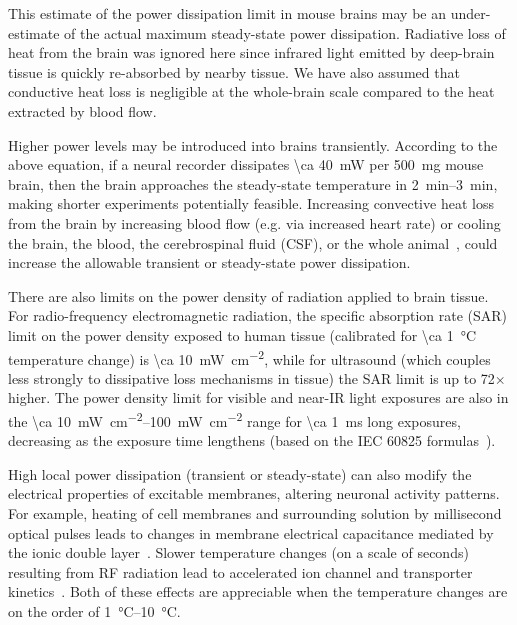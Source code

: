 This estimate of the power dissipation limit in mouse brains may be an under-estimate of the actual maximum steady-state power dissipation. 
Radiative loss of heat from the brain was ignored here since infrared light emitted by deep-brain tissue is quickly re-absorbed by nearby tissue.
We have also assumed that conductive heat loss is negligible at the whole-brain scale compared to the heat extracted by blood flow.

Higher power levels may be introduced into brains transiently.
According to the above equation, if a neural recorder dissipates \SI{\ca 40}{\milli\watt} per \SI{500}{\milli\gram} mouse brain, then the brain approaches the steady-state temperature in \SIrange{2}{3}{\minute}, making shorter experiments potentially feasible.
Increasing convective heat loss from the brain by increasing blood flow (e.g. via increased heart rate) or cooling the brain, the blood, the cerebrospinal fluid (CSF), or the whole animal~\cite{polderman2004}, could increase the allowable transient or steady-state power dissipation.

There are also limits on the power density of radiation applied to brain tissue.
For radio-frequency electromagnetic radiation, the specific absorption rate (SAR) limit on the power density exposed to human tissue (calibrated for \SI{\ca 1}{\celsius} temperature change) is \SI{\ca 10}{\milli\watt\per\centi\meter\squared}, while for ultrasound (which couples less strongly to dissipative loss mechanisms in tissue) the SAR limit is up to 72$\times$ higher.
The power density limit for visible and near-IR light exposures are also in the \SIrange{\ca 10}{100}{\milli\watt\per\centi\meter\squared} range for \SI{\ca 1}{\milli\second} long exposures, decreasing as the exposure time lengthens (based on the IEC 60825 formulas~\cite{iec60825}).

High local power dissipation (transient or steady-state) can also modify the electrical properties of excitable membranes, altering neuronal activity patterns.
For example, heating of cell membranes and surrounding solution by millisecond optical pulses leads to changes in membrane electrical capacitance mediated by the ionic double layer~\cite{shapiro12}.
Slower temperature changes (on a scale of seconds) resulting from RF radiation lead to accelerated ion channel and transporter kinetics~\cite{shapiro13}.
Both of these effects are appreciable when the temperature changes are on the order of \SIrange{1}{10}{\degreeCelsius}.

